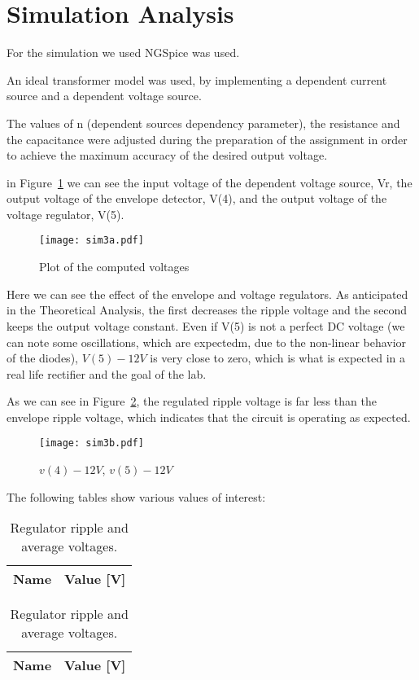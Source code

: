 \section{Simulation Analysis}
\label{sec:simulation}

For the simulation we used NGSpice was used.

An ideal transformer model was used, by implementing a dependent current source and a dependent voltage source. 

The values of n (dependent sources dependency parameter), the resistance and the capacitance were adjusted during the preparation of the assignment in order to achieve
the maximum accuracy of the desired output voltage.

in Figure~\ref{fig:sim3a} we can see the input voltage of the dependent voltage source, Vr, the output voltage of the envelope detector, V(4), and the output voltage of the voltage regulator, V(5).


\begin{figure}[h] \centering
\texttt{[image: sim3a.pdf]}
	\caption{Plot of the computed voltages}
\label{fig:sim3a}
\end{figure}


Here we can see the effect of the envelope and voltage regulators. As anticipated in the Theoretical Analysis, the first decreases the ripple voltage and 
the second keeps the output voltage constant. Even if V(5) is not a perfect DC voltage (we can note some oscillations, which are expectedm, due to the non-linear behavior of the diodes), $V(5) - 12V$ is 
very close to zero, which is what is expected in a real life rectifier and the goal of the lab. 

As we can see in Figure~\ref{fig:sim3b}, the regulated ripple voltage is far less than the envelope ripple voltage, which indicates that the circuit is operating as expected. 

\begin{figure}[h] \centering
\texttt{[image: sim3b.pdf]}
	\caption{$v(4)-12V$, $v(5)-12V$}                        
\label{fig:sim3b} 
\end{figure}

The following tables show various values of interest:

\begin{table}[h]
        \parbox{.45\linewidth}{
  \centering
  \begin{tabular}{|l|r|}
    \hline
    {\bf Name} & {\bf Value [V]} \\ \hline
    
  \end{tabular}
  \caption{Envelope ripple and average voltages.}
	\label{tab:env}
}
\hfill
        \parbox{.45\linewidth}{
  \centering
  \begin{tabular}{|l|r|}
    \hline
    {\bf Name} & {\bf Value [V]} \\ \hline
    
  \end{tabular}
  \caption{Regulator ripple and average voltages.}
  \label{tab:reg}
}
\end{table}






